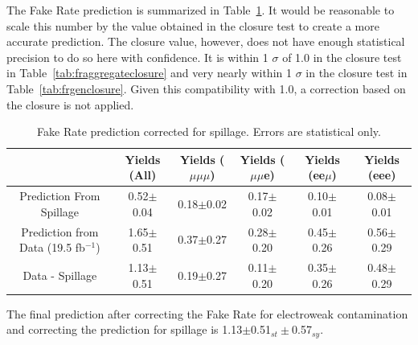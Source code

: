 The Fake Rate prediction is summarized in Table~\ref{tab:FRPrediction}. It would be reasonable to scale this number by the value obtained in the closure test to create a more accurate prediction. The closure value, however, does not have enough statistical precision to do so here with confidence. It is within 1 $\sigma$ of 1.0 in the closure test in Table~\ref{tab:fraggregateclosure} and very nearly within 1 $\sigma$ in the closure test in Table~\ref{tab:frgenclosure}. Given this compatibility with 1.0, a correction based on the closure is not applied.\\

\begin{table}[ht!]
\begin{center}
\caption{\small \label{tab:FRPrediction} Fake Rate prediction corrected for spillage. Errors are statistical only.}
\begin{tabular}{c|ccccc}\hline
                                              &Yields (All)      &Yields ($\mu\mu\mu$)  &Yields ($\mu\mu$e)  &Yields (ee$\mu$)  &Yields (eee)\\
\hline \hline
Prediction From Spillage                      & 0.52$\pm$0.04   & 0.18$\pm$0.02   & 0.17$\pm$0.02   & 0.10$\pm$0.01   & 0.08$\pm$0.01 \\ 
\hline
Prediction from Data (19.5 fb$^{-1}$)          & 1.65$\pm$0.51   & 0.37$\pm$0.27   & 0.28$\pm$0.20   & 0.45$\pm$0.26   & 0.56$\pm$0.29 \\
\hline
Data - Spillage                               & 1.13$\pm$0.51   & 0.19$\pm$0.27   & 0.11$\pm$0.20   & 0.35$\pm$0.26   & 0.48$\pm$0.29 \\
\end{tabular}
\end{center}
\end{table}


The final prediction after correcting the Fake Rate for electroweak contamination and correcting the prediction for spillage is 1.13$\pm$0.51$_{st} \pm$0.57$_{sy}$.
















		

